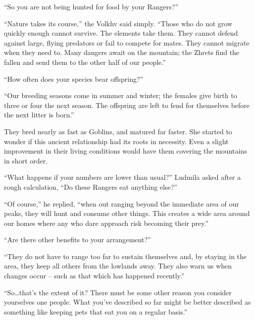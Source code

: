  

“So you are not being hunted for food by your Rangers?”

 

“Nature takes its course,” the Volkhv said simply. “Those who do not grow quickly enough cannot survive. The elements take them. They cannot defend against large, flying predators or fail to compete for mates. They cannot migrate when they need to. Many dangers await on the mountain; the Zhrets find the fallen and send them to the other half of our people.”

 

“How often does your species bear offspring?”

 

“Our breeding seasons come in summer and winter; the females give birth to three or four the next season. The offspring are left to fend for themselves before the next litter is born.”

 

They bred nearly as fast as Goblins, and matured far faster. She started to wonder if this ancient relationship had its roots in necessity. Even a slight improvement in their living conditions would have them covering the mountains in short order.

 

“What happens if your numbers are lower than usual?” Ludmila asked after a rough calculation, “Do these Rangers eat anything else?”

 

“Of course,” he replied, “when out ranging beyond the immediate area of our peaks, they will hunt and consume other things. This creates a wide area around our homes where any who dare approach risk becoming their prey.”

 

“Are there other benefits to your arrangement?”

 

“They do not have to range too far to sustain themselves and, by staying in the area, they keep all others from the lowlands away. They also warn us when changes occur – such as that which has happened recently.”

 

“So…that’s the extent of it? There must be some other reason you consider yourselves one people. What you’ve described so far might be better described as something like keeping pets that eat you on a regular basis.”

 

